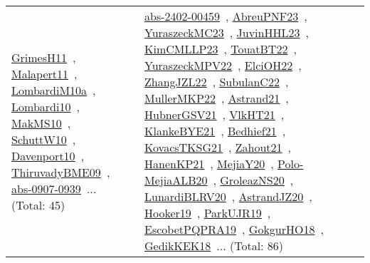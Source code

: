 {\begin{longtable}{lp{3cm}>{\raggedright\arraybackslash}p{6cm}>{\raggedright\arraybackslash}p{6cm}>{\raggedright\arraybackslash}p{8cm}}
\href{../works/GrimesH11.pdf}{GrimesH11}~\cite{GrimesH11}, \href{../works/Malapert11.pdf}{Malapert11}~\cite{Malapert11}, \href{../works/LombardiM10a.pdf}{LombardiM10a}~\cite{LombardiM10a}, \href{../works/Lombardi10.pdf}{Lombardi10}~\cite{Lombardi10}, \href{../works/MakMS10.pdf}{MakMS10}~\cite{MakMS10}, \href{../works/SchuttW10.pdf}{SchuttW10}~\cite{SchuttW10}, \href{../works/Davenport10.pdf}{Davenport10}~\cite{Davenport10}, \href{../works/ThiruvadyBME09.pdf}{ThiruvadyBME09}~\cite{ThiruvadyBME09}, \href{../works/abs-0907-0939.pdf}{abs-0907-0939}~\cite{abs-0907-0939}... (Total: 45) & \href{../works/abs-2402-00459.pdf}{abs-2402-00459}~\cite{abs-2402-00459}, \href{../works/AbreuPNF23.pdf}{AbreuPNF23}~\cite{AbreuPNF23}, \href{../works/YuraszeckMC23.pdf}{YuraszeckMC23}~\cite{YuraszeckMC23}, \href{../works/JuvinHHL23.pdf}{JuvinHHL23}~\cite{JuvinHHL23}, \href{../works/KimCMLLP23.pdf}{KimCMLLP23}~\cite{KimCMLLP23}, \href{../works/TouatBT22.pdf}{TouatBT22}~\cite{TouatBT22}, \href{../works/YuraszeckMPV22.pdf}{YuraszeckMPV22}~\cite{YuraszeckMPV22}, \href{../works/ElciOH22.pdf}{ElciOH22}~\cite{ElciOH22}, \href{../works/ZhangJZL22.pdf}{ZhangJZL22}~\cite{ZhangJZL22}, \href{../works/SubulanC22.pdf}{SubulanC22}~\cite{SubulanC22}, \href{../works/MullerMKP22.pdf}{MullerMKP22}~\cite{MullerMKP22}, \href{../works/Astrand21.pdf}{Astrand21}~\cite{Astrand21}, \href{../works/HubnerGSV21.pdf}{HubnerGSV21}~\cite{HubnerGSV21}, \href{../works/VlkHT21.pdf}{VlkHT21}~\cite{VlkHT21}, \href{../works/KlankeBYE21.pdf}{KlankeBYE21}~\cite{KlankeBYE21}, \href{../works/Bedhief21.pdf}{Bedhief21}~\cite{Bedhief21}, \href{../works/KovacsTKSG21.pdf}{KovacsTKSG21}~\cite{KovacsTKSG21}, \href{../works/Zahout21.pdf}{Zahout21}~\cite{Zahout21}, \href{../works/HanenKP21.pdf}{HanenKP21}~\cite{HanenKP21}, \href{../works/MejiaY20.pdf}{MejiaY20}~\cite{MejiaY20}, \href{../works/Polo-MejiaALB20.pdf}{Polo-MejiaALB20}~\cite{Polo-MejiaALB20}, \href{../works/GroleazNS20.pdf}{GroleazNS20}~\cite{GroleazNS20}, \href{../works/LunardiBLRV20.pdf}{LunardiBLRV20}~\cite{LunardiBLRV20}, \href{../works/AstrandJZ20.pdf}{AstrandJZ20}~\cite{AstrandJZ20}, \href{../works/Hooker19.pdf}{Hooker19}~\cite{Hooker19}, \href{../works/ParkUJR19.pdf}{ParkUJR19}~\cite{ParkUJR19}, \href{../works/EscobetPQPRA19.pdf}{EscobetPQPRA19}~\cite{EscobetPQPRA19}, \href{../works/GokgurHO18.pdf}{GokgurHO18}~\cite{GokgurHO18}, \href{../works/GedikKEK18.pdf}{GedikKEK18}~\cite{GedikKEK18}... (Total: 86)\\

\end{longtable}}
